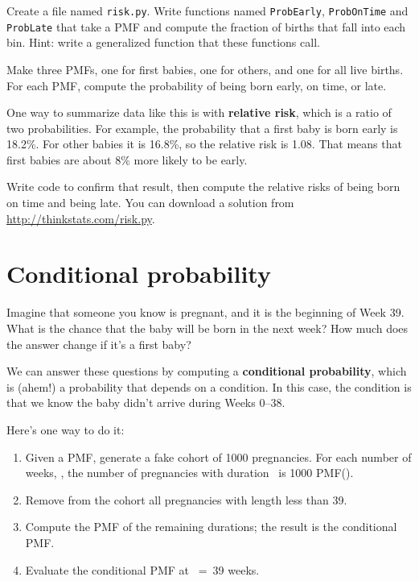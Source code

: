 \documentclass[12pt]{book}
\begin{document}
\begin{exercise}
Create a file named {\tt risk.py}.
Write functions named {\tt ProbEarly}, {\tt ProbOnTime} and
{\tt ProbLate} that take a PMF and compute the fraction of births
that fall into each bin.  Hint: write a generalized function
that these functions call.

Make three PMFs, one for first babies, one for others, and one for
all live births.  For each PMF, compute the probability of being
born early, on time, or late.

One way to summarize data like this is with {\bf relative risk},
which is a ratio of two probabilities.  For example, the probability
that a first baby is born early is 18.2\%.  For other babies it is
16.8\%, so the relative risk is 1.08.  That means that first babies
are about 8\% more likely to be early.

Write code to confirm that result, then compute the relative risks of
being born on time and being late.  You can download a solution
from \url{http://thinkstats.com/risk.py}.

\end{exercise}


\section{Conditional probability}

Imagine that someone you know is pregnant, and it is the beginning of
Week 39.  What is the chance that the baby will be born in the next
week?  How much does the answer change if it's a first baby?

We can answer these questions by computing a {\bf conditional
probability}, which is (ahem!) a probability that depends on a condition.
In this case, the condition is that we know the baby didn't arrive
during Weeks 0--38.

Here's one way to do it:

\begin{enumerate}

\item Given a PMF, generate a fake cohort of 1000 pregnancies.
For each number of weeks, \x, the number of pregnancies with
duration \x~is 1000 PMF(\x).

\item Remove from the cohort all pregnancies with length less than 39.

\item Compute the PMF of the remaining durations; the result is the
conditional PMF.

\item Evaluate the conditional PMF at \x~=~39 weeks.

\end{enumerate}
\end{document}
